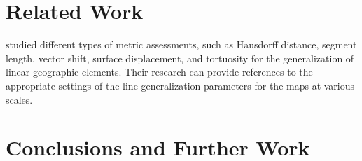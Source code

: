 \documentclass{article}
\begin{document}
\section{Related Work}
\label{sec:related_work}

\cite{stanislawski2012automated} studied different types of metric assessments,
such as Hausdorff distance, segment length, vector shift, surface displacement,
and tortuosity for the generalization of linear geographic elements. Their
research can provide references to the appropriate settings of the line
generalization parameters for the maps at various scales.


\section{Conclusions and Further Work}
\label{sec:conclusions_and_further_work}

\printbibliography
\end{document}
